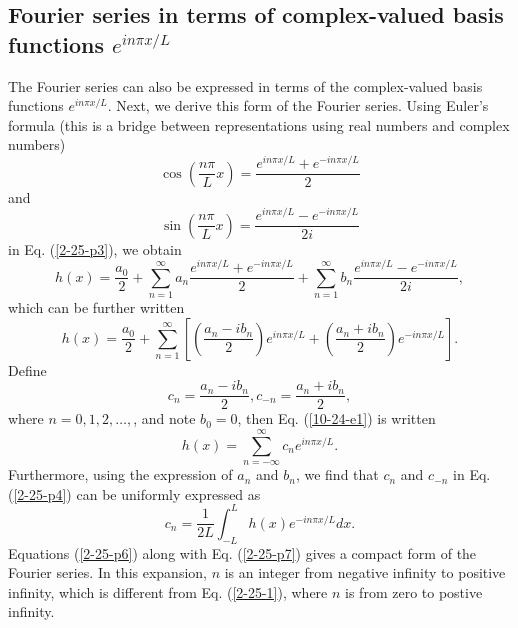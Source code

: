 \documentclass{article}
\begin{document}
\subsection{Fourier series in terms of complex-valued basis functions $e^{i n
\pi x / L}$}

The Fourier series can also be expressed in terms of the complex-valued basis
functions $e^{i n \pi x / L}$. Next, we derive this form of the Fourier
series. Using Euler's formula (this is a bridge between representations using
real numbers and complex numbers)
\begin{equation}
  \cos \left( \frac{n \pi}{L} x \right) = \frac{e^{i n \pi x / L} + e^{- i n
  \pi x / L}}{2}
\end{equation}
and
\begin{equation}
  \sin \left( \frac{n \pi}{L} x \right) = \frac{e^{i n \pi x / L} - e^{- i n
  \pi x / L}}{2 i}
\end{equation}
in Eq. (\ref{2-25-p3}), we obtain
\begin{equation}
  h (x) = \frac{a_0}{2} + \sum_{n = 1}^{\infty} a_n \frac{e^{i n \pi x / L} +
  e^{- i n \pi x / L}}{2} + \sum_{n = 1}^{\infty} b_n \frac{e^{i n \pi x / L}
  - e^{- i n \pi x / L}}{2 i},
\end{equation}
which can be further written
\begin{equation}
  \label{10-24-e1} h (x) = \frac{a_0}{2} + \sum_{n = 1}^{\infty} \left[ \left(
  \frac{a_n - i b_n}{2} \right) e^{i n \pi x / L} + \left( \frac{a_n + i
  b_n}{2} \right) e^{- i n \pi x / L} \right] .
\end{equation}
Define
\begin{equation}
  \label{2-25-p4} c_n = \frac{a_n - i b_n}{2}, c_{- n} = \frac{a_n + i
  b_n}{2},
\end{equation}
where $n = 0, 1, 2, \ldots,$, and note $b_0 = 0$, then Eq. (\ref{10-24-e1}) is
written
\begin{equation}
  \label{2-25-p6} h (x) = \sum_{n = - \infty}^{\infty} c_n e^{i n \pi x / L} .
\end{equation}
Furthermore, using the expression of $a_n$ and $b_n$, we find that $c_n$ and
$c_{- n}$ in Eq. (\ref{2-25-p4}) can be uniformly expressed as
\begin{equation}
  \label{2-25-p7} c_n = \frac{1}{2 L} \int_{- L}^L h (x) e^{- i n \pi x / L} d
  x.
\end{equation}
Equations (\ref{2-25-p6}) along with Eq. (\ref{2-25-p7}) gives a compact form
of the Fourier series{\cite{snieder1994}}. In this expansion, $n$ is an
integer from negative infinity to positive infinity, which is different from
Eq. (\ref{2-25-1}), where $n$ is from zero to postive infinity.
\end{document}
